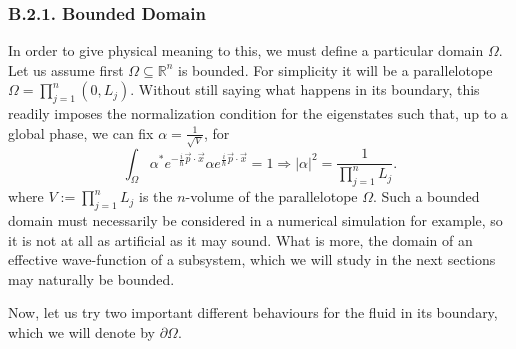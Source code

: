\documentclass[11pt, a4paper]{article} %
\newcommand{\R}{\mathbb{R}} %
\begin{document}
\subsubsection*{B.2.1. Bounded Domain}
In order to give physical meaning to this, we must define a particular domain $\Omega$. Let us assume first $\Omega\subseteq \R^n$ is bounded. For simplicity it will be a parallelotope $\Omega=\prod_{j=1}^n(0,L_j)$. Without still saying what happens in its boundary, this readily imposes the normalization condition for the eigenstates such that, up to a global phase, we can fix $\alpha=\frac{1}{\sqrt{V}}$, for
\begin{equation}
\int_\Omega \alpha^*e^{-\frac{i}{\hbar}\vec{p}\cdot \vec{x}}\alpha e^{\frac{i}{\hbar}\vec{p}\cdot \vec{x}}=1\Longrightarrow |\alpha|^2=\frac{1}{\prod_{j=1}^nL_j}.
\end{equation}
where $V:=\prod_{j=1}^nL_j$ is the $n$-volume of the parallelotope $\Omega$. Such a bounded domain must necessarily be considered in a numerical simulation for example, so it is not at all as artificial as it may sound. What is more, the domain of an effective wave-function of a subsystem, which we will study in the next sections may naturally be bounded.

Now, let us try two important different behaviours for the fluid in its boundary, which we will denote by $\partial \Omega$.
\end{document}
